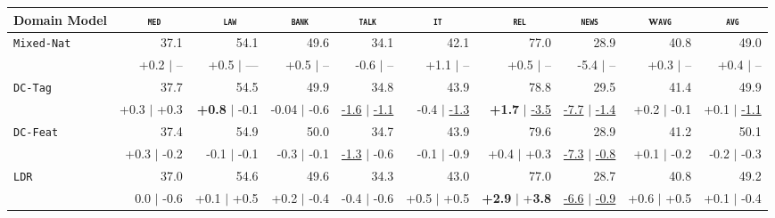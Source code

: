 \documentclass[11pt,a4paper]{article}
\newcommand{\domain}[1]{\texttt{\textsc{#1}}}
\newcommand{\system}[1]{\texttt{{#1}}}
\newcommand{\SB}[1]{\textbf{#1}}
\newcommand{\SW}[1]{\underline{#1}}
\newcommand{\sbcl}[2]{{\scriptsize #1 \hfill $|$ \hfill  #2}}
\begin{document}
\begin{table*}
  \centering
  \begin{tabular}{|p{1.6cm}|*{9}{r|}} \hline
    \footnotesize
   \hfill Domain  Model \hfill & \multicolumn{1}{c|}{\domain{ med}} & \multicolumn{1}{c|}{\domain{ law}} & \multicolumn{1}{c|}{\domain{bank}} & \multicolumn{1}{c|}{\domain{talk}} & \multicolumn{1}{c|}{\domain{ it }} & \multicolumn{1}{c|}{\domain{ rel}} & \multicolumn{1}{c|}{\domain{news}} & \multicolumn{1}{c|}{w\domain{avg}} & \multicolumn{1}{c|}{\domain{avg}} \\ \hline 
    \footnotesize\system{Mixed-Nat}  & 37.1  & 54.1  & 49.6	& 34.1  & 42.1	& 77.0 & 28.9 & 40.8	& 49.0 \\[-2pt]
                   & \sbcl{+0.2}{--}  &\sbcl{+0.5}{---} &\sbcl{+0.5}{--} &\sbcl{-0.6}{--} &\sbcl{+1.1}{--} &\sbcl{+0.5}{--} &\sbcl{-5.4}{--} &\sbcl{+0.3}{--} & \sbcl{+0.4}{--} \\
    \hline%
    \footnotesize \system{DC-Tag}      &  37.7 & 54.5   & 49.9    &  34.8 &  43.9  & 78.8 & 29.5  & 41.4 & 49.9\\[-2pt]
                   & \sbcl{+0.3}{+0.3}  & \sbcl{\SB{+0.8}}{-0.1}   & \sbcl{-0.04}{-0.6}  & \sbcl{\SW{-1.6}}{\SW{-1.1}}  &  \sbcl{-0.4}{\SW{-1.3}}  & \sbcl{\SB{+1.7}}{\SW{-3.5}}  & \sbcl{\SW{-7.7}}{\SW{-1.4}}  & \sbcl{+0.2}{-0.1} & \sbcl{+0.1}{\SW{-1.1}}\\
                   
    \footnotesize \system{DC-Feat}     & 37.4 & 54.9   & 50.0    & 34.7  &  43.9  & 79.6 & 28.9  & 41.2 & 50.1\\[-2pt]
                   &  \sbcl{+0.3}{-0.2} & \sbcl{-0.1}{-0.1}  & \sbcl{-0.3}{-0.1} & \sbcl{\SW{-1.3}}{-0.6} & \sbcl{-0.1}{-0.9} & \scriptsize \sbcl{+0.4}{+0.3} & \sbcl{\SW{-7.3}}{\SW{-0.8}} & \sbcl{+0.1}{-0.2} & \sbcl{-0.2}{-0.3}\\
    
    \footnotesize \system{LDR}    & 37.0   & 54.6  & 49.6    & 34.3  &  43.0  &77.0  & 28.7 & 40.8 & 49.2 \\[-2pt]
                    & \sbcl{0.0}{-0.6} &  \sbcl{+0.1}{+0.5} & \sbcl{+0.2}{-0.4} &  \sbcl{-0.4}{-0.6} &  \sbcl{+0.5}{+0.5} & \sbcl{\SB{+2.9}}{+\SB{3.8}} & \sbcl{\SW{-6.6}}{\SW{-0.9}} & \sbcl{+0.6}{+0.5} &  \sbcl{+0.1}{-0.4} \\


\end{tabular}
\end{table*}
\end{document}
